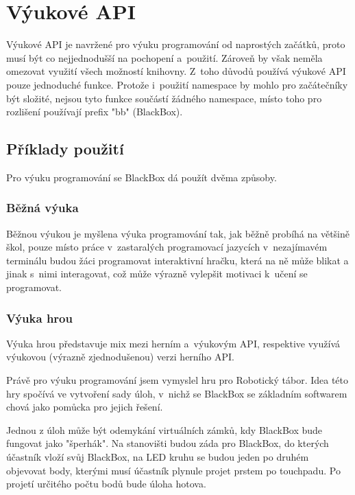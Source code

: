 \chapter{Výukové API}

Výukové API je navržené pro výuku programování od naprostých začátků, proto musí být co nejjednodušší na pochopení a~použití.
Zároveň by však neměla omezovat využití všech možností knihovny.
Z~toho důvodů používá výukové API pouze jednoduché funkce.
Protože i~použití namespace by mohlo pro začátečníky být složité, nejsou tyto funkce součástí žádného namespace, místo toho pro rozlišení používají prefix "bb" (BlackBox).



\section{Příklady použití}

Pro výuku programování se BlackBox dá použít dvěma způsoby.

\subsection{Běžná výuka}

Běžnou výukou je myšlena výuka programování tak, jak běžně probíhá na většině škol, pouze místo práce v~zastaralých programovací jazycích v~nezajímavém terminálu budou žáci programovat interaktivní hračku, která na ně může blikat a jinak s~nimi interagovat, což může výrazně vylepšit motivaci k~učení se programovat.

\subsection{Výuka hrou}

Výuka hrou představuje mix mezi herním a~výukovým API, respektive využívá výukovou (výrazně zjednodušenou) verzi herního API.

Právě pro výuku programování jsem vymyslel hru pro Robotický tábor.
Idea této hry spočívá ve vytvoření sady úloh, v~nichž se BlackBox se základním softwarem chová jako pomůcka pro jejich řešení.

Jednou z úloh může být odemykání virtuálních zámků, kdy BlackBox bude fungovat jako "šperhák".
Na stanovišti budou záda pro BlackBox, do kterých účastník vloží svůj BlackBox, na LED kruhu se budou jeden po druhém objevovat body, kterými musí účastník plynule projet prstem po touchpadu.
Po projetí určitého počtu bodů bude úloha hotova.

